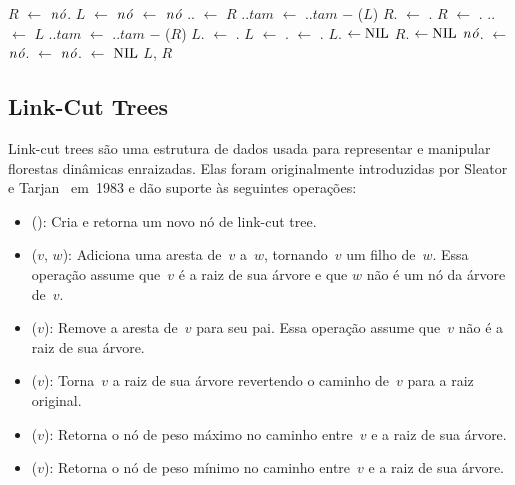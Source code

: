 \begin{algorithm}
\caption{\treapSplitRight($\node$)}
\label{Algo:TREAPsplitRight}
\begin{algorithmic}[1]
\State $R$ $\gets $ $\node$.
\State $L$ $\gets $ $\node$ \label{Algo:TREAPsplitRight:linha:atribuicao}
\State {} $\gets$ $\node$
    \State {}.. $\gets$ $R$
    \State {}..$tam$ $\gets$ ..$tam$ $\mathit{-}$ \treapGetSize($L$)
    \State $R$. $\gets$ .
    \EndIf
    \State $R$ $\gets$ .
  \Else
    \State {}.. $\gets$ $L$ 
    \State {}..$tam$ $\gets$ ..$tam$ $\mathit{-}$ \treapGetSize($R$)
    \State $L$. $\gets$ .
    \EndIf
    \State $L$ $\gets$ .
  \EndIf
  \State {} $\gets$ .
\EndWhile
{} $L$. $\gets\text{NIL}$\EndIf
{} $R$. $\gets\text{NIL}$\EndIf
\State $\node$. $\gets $ $\node$. $\gets$ $\node$. $\gets$ $\text{NIL}$
\State\Return $L$, $R$
\end{algorithmic}
\end{algorithm}

\subsection{Link-Cut Trees}
\label{sec:linkcuttree}
Link-cut trees são uma estrutura de dados usada para representar e manipular florestas dinâmicas enraizadas.
Elas foram originalmente introduzidas por Sleator e Tarjan~\cite{SleatroTarjanLinkCutTree1983,} em~1983 e dão suporte às seguintes operações:
\begin{itemize}
\item \linkcutCreate(): Cria e retorna um novo nó de link-cut tree.
\item \linkcutAddEdge($v$, $w$): Adiciona uma aresta de~$v$ a~$w$, tornando~$v$ um filho de~$w$. Essa operação assume que~$v$ é a raiz de sua árvore e que $w$ não é um nó da árvore de~$v$.
\item \linkcutDelEdge($v$): Remove a aresta de~$v$ para seu pai.
	Essa operação assume que~$v$ não é a raiz de sua árvore.
\item \linkcutEvert($v$): Torna~$v$ a raiz de sua árvore revertendo o caminho de~$v$ para a raiz original.
\item \linkcutMax($v$): Retorna o nó de peso máximo no caminho entre~$v$ e a raiz de sua árvore.
\item \linkcutMin($v$): Retorna o nó de peso mínimo no caminho entre~$v$ e a raiz de sua árvore.
\end{itemize}


